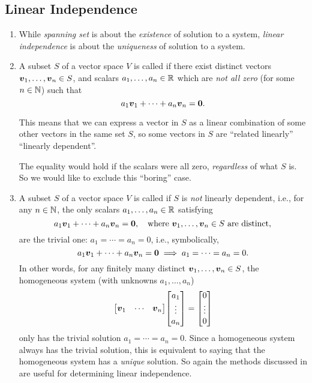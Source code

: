 \subsection{Linear Independence}
\begin{enumerate}
\item While \emph{spanning set} is about the \emph{existence} of solution to a
system, \emph{linear independence} is about the \emph{uniqueness} of solution
to a system.

\item A subset \(S\) of a vector space \(V\) is called  if there exist distinct vectors \(\vb*{v}_1,\dotsc,\vb*{v}_n\in
S\), and scalars \(a_1,\dotsc,a_n\in\mathbb{R}\) which are \emph{not all zero} (for
some \(n\in\mathbb{N}\)) such that
\[
a_1\vb*{v}_1+\dotsb+a_n\vb*{v}_n=\vb*{0}.
\]
\begin{intuition}
This means that we can express a vector in \(S\) as a linear combination of
some other vectors in the same set \(S\), so some vectors in \(S\) are
``related linearly''  ``linearly dependent''.

The equality would hold if the scalars were all zero, \emph{regardless} of what
\(S\) is. So we would like to exclude this ``boring'' case.
\end{intuition}

\item A subset \(S\) of a vector space \(V\) is called  if \(S\) is \emph{not} linearly dependent, i.e., for any
\(n\in\mathbb{N}\), the only scalars \(a_1,\dotsc,a_n\in\mathbb{R}\) satisfying
\[
a_1\vb*{v}_1+\dotsb+a_n\vb*{v}_n=\vb*{0},\quad\text{where
\(\vb*{v}_1,\dotsc,\vb*{v}_n\in S\) are distinct},
\]
are the trivial one: \(a_1=\dotsb=a_n=0\), i.e., symbolically,
\[
a_1\vb*{v}_1+\dotsb+a_n\vb*{v}_n=\vb*{0}
\implies a_1=\dotsb=a_n=0.
\]
In other words, for any finitely
many distinct \(\vb*{v}_1,\dotsc,\vb*{v}_n\in S\), the homogeneous system
(with unknowns \(a_1,\dotsc,a_n\))
\[
\mqty[\vect{v}_1&\cdots&\vect{v}_n]\mqty[a_1\\\vdots\\ a_n]=\mqty[0\\\vdots\\ 0]
\]
only has the trivial solution \(a_1=\dotsb=a_n=0\). Since a homogeneous system
always has the trivial solution, this is equivalent to saying that the
homogeneous system has a \emph{unique} solution. So again the methods discussed
in  are useful for determining linear independence.


\end{enumerate}
